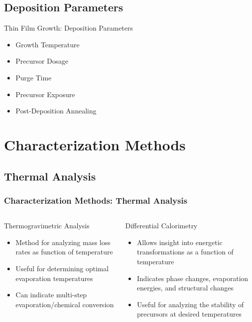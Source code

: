 \documentclass[professionalfont]{beamer}
\begin{document}
\subsection{Deposition Parameters}
\begin{frame}{Thin Film Growth: Deposition Parameters}
\begin{itemize}
	\large
	\item Growth Temperature
	\vspace{1.5em}
	\item Precursor Dosage
	\vspace{1.5em}
	\item Purge Time
	\vspace{1.5em}
	\item Precursor Exposure
	\vspace{1.5em}
	\item Post-Deposition Annealing
	\end{itemize}
\end{frame}


\section{Characterization Methods}

\subsection{Thermal Analysis}
\begin{frame}
	\vspace{-0.5cm}
	\frametitle{Characterization Methods: Thermal Analysis}
	\begin{columns}[t]
			\begin{block}{Thermogravimetric Analysis}
				\begin{itemize}
					\item Method for analyzing mass loss rates as function of temperature
					\item Useful for determining optimal evaporation temperatures
					\item Can indicate multi-step evaporation/chemical conversion
				\end{itemize}
			\end{block}
			\begin{block}{Differential Calorimetry}
				\begin{itemize}
					\item Allows insight into energetic transformations as a function of temperature
					\item Indicates phase changes, evaporation energies, and structural changes
					\item Useful for analyzing the stability of precursors at desired temperatures
				\end{itemize}
			\end{block}
	\end{columns}
\end{frame}
\end{document}
